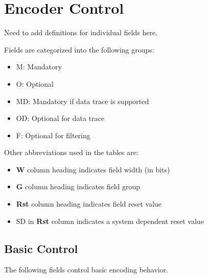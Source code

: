 \chapter{Encoder Control} \label{encoderControl}

Need to add definitions for individual fields here.

Fields are categorized into the following groups:

\begin{itemize}
  \item M: Mandatory
  \item O: Optional
  \item MD: Mandatory if data trace is supported
  \item OD: Optional for data trace
  \item F: Optional for filtering
\end{itemize}

Other abbreviations used in the tables are:
\begin{itemize}
  \item \textbf{W} column heading indicates field width (in bits)
  \item \textbf{G} column heading indicates field group
  \item \textbf{Rst} column heading indicates field reset value
  \item SD in \textbf{Rst} column indicates a system dependent reset value
\end{itemize}

\section{Basic Control} \label{sec:ctl-basic}

The following fields control basic encoding behavior.

